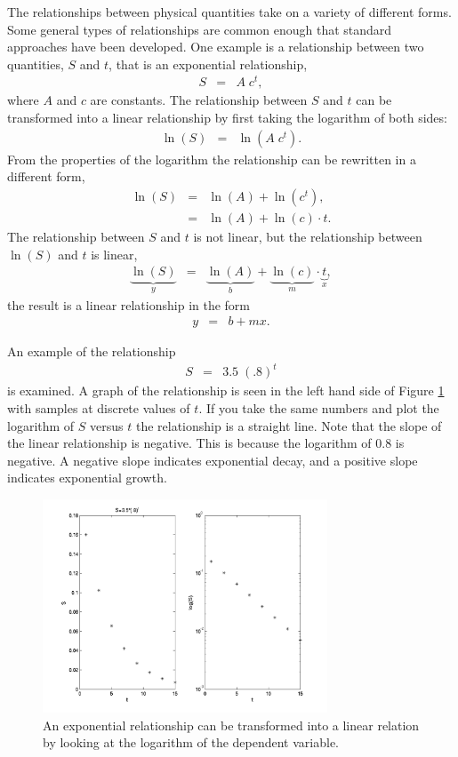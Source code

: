 \documentclass[12pt]{article}
\newcommand{\lp}{\left(}
\newcommand{\rp}{\right)}
\begin{document}
The relationships between physical quantities take on a variety of
different forms. Some general types of relationships are common enough
that standard approaches have been developed. One example is a
relationship between two quantities, $S$ and $t$, that is an
exponential relationship,
\begin{eqnarray*}
  S & = & A \; c^{t},
\end{eqnarray*}
where $A$ and $c$ are constants.  The relationship between $S$ and $t$
can be transformed into a linear relationship by first taking the
logarithm of both sides:
\begin{eqnarray*}
  \ln(S) & = & \ln\lp A \; c^{t} \rp.
\end{eqnarray*}
From the properties of the logarithm the relationship can be rewritten
in a different form,
\begin{eqnarray*}
  \ln(S) & = & \ln\lp A\rp + \ln\lp c^{t} \rp, \\
         & = & \ln\lp A\rp + \ln\lp c\rp \cdot t.
\end{eqnarray*}
The relationship between $S$ and $t$ is not linear, but the
relationship between $\ln(S)$ and $t$ is linear,
\begin{eqnarray*}
  \underbrace{\ln(S)}_y
  & = & 
  \underbrace{\ln\lp A\rp}_b + 
  \underbrace{\ln\lp c\rp}_m \cdot \underbrace{t}_x, 
\end{eqnarray*}
the result is a linear relationship in the form
\begin{eqnarray*}
  y & = & b + mx.
\end{eqnarray*}

An example of the  relationship
\begin{eqnarray*}
  S & = & 3.5\; \lp .8 \rp^{t}
\end{eqnarray*}
is examined.  A graph of the relationship is seen in the left hand
side of Figure \ref{fig:semilog} with samples at discrete values of
$t$. If you take the same numbers and plot the logarithm of $S$ versus
$t$ the relationship is a straight line. Note that the slope of the
linear relationship is negative. This is because the logarithm of
$0.8$ is negative. A negative slope indicates exponential decay, and a
positive slope indicates exponential growth.

\begin{figure}[tb]
  \centerline{\includegraphics[height=2.5in]{semilog}}
  \caption{An exponential relationship can be transformed into a
    linear relation by looking at the logarithm of the dependent
    variable.}
  \label{fig:semilog}
\end{figure}
\end{document}
